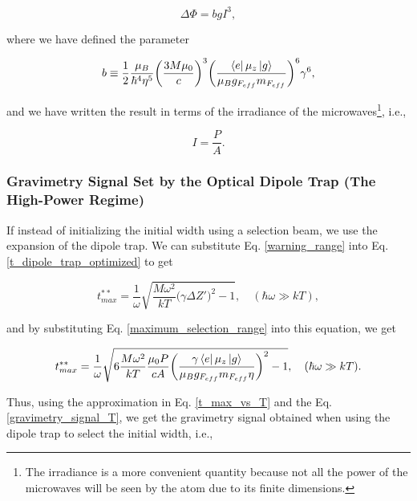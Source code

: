 \documentclass{article}
\begin{document}
\begin{equation}\label{gravimetry_signal_irradiance}
    \Delta \Phi = b g I^3, 
\end{equation}

where we have defined the parameter

\begin{equation}
    b \equiv \frac{1}{2} \frac{ \mu_{B}}{ \hbar^{4} \eta^{5}} \bigg(\frac{3M \mu_{0}}{c} \bigg)^{3} \bigg(\frac{\bra{e} \mu_{z} \ket{g}}{\mu_{B} g_{F_{eff}} m_{F_{eff}}} \bigg)^{6} \gamma^6,
\end{equation}

and we have written the result in terms of the irradiance of the microwaves\footnote{The irradiance is a more convenient quantity because not all the power of the microwaves will be seen by the atom due to its finite dimensions.}, i.e.,

\begin{equation}
    I = \frac{P}{A}.
\end{equation}

\subsubsection{Gravimetry Signal Set by the Optical Dipole Trap (The High-Power Regime)}
If instead of initializing the initial width using a selection beam, we use the expansion of the dipole trap. We can substitute Eq. \ref{warning_range} into Eq. \ref{t_dipole_trap_optimized} to get

\begin{equation}
        t^{**}_{max} = \frac{1}{\omega} \sqrt{\frac{M \omega^{2}}{kT} \bigg( \gamma \Delta Z' \bigg)^{2} - 1}, \quad (\hbar \omega \gg kT),
\end{equation}

and by substituting Eq. \ref{maximum_selection_range} into this equation, we get

\begin{equation}
        t^{**}_{max} = \frac{1}{\omega} \sqrt{6 \frac{M \omega^{2}}{kT} \frac{\mu_{0} P}{ c A} \bigg(\frac{ \gamma  \bra{e} \mu_{z} \ket{g}}{\mu_{B} g_{F_{eff}} m_{F_{eff}} \eta}\bigg)^{2} - 1}, \quad (\hbar \omega \gg kT).
\end{equation}

Thus, using the approximation in Eq. \ref{t_max_vs_T} and the Eq. \ref{gravimetry_signal_T}, we get the gravimetry signal obtained when using the dipole trap to select the initial width, i.e.,
\end{document}

